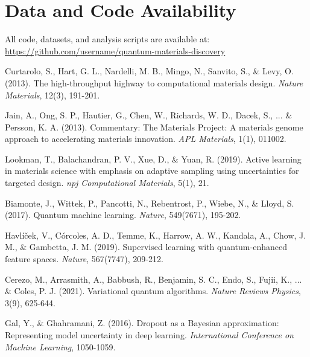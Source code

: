 \documentclass[twocolumn]{article}
\begin{document}
\section*{Data and Code Availability}

All code, datasets, and analysis scripts are available at: \url{https://github.com/username/quantum-materials-discovery}

\begin{thebibliography}{30}

Curtarolo, S., Hart, G. L., Nardelli, M. B., Mingo, N., Sanvito, S., \& Levy, O. (2013). The high-throughput highway to computational materials design. \textit{Nature Materials}, 12(3), 191-201.

Jain, A., Ong, S. P., Hautier, G., Chen, W., Richards, W. D., Dacek, S., ... \& Persson, K. A. (2013). Commentary: The Materials Project: A materials genome approach to accelerating materials innovation. \textit{APL Materials}, 1(1), 011002.

Lookman, T., Balachandran, P. V., Xue, D., \& Yuan, R. (2019). Active learning in materials science with emphasis on adaptive sampling using uncertainties for targeted design. \textit{npj Computational Materials}, 5(1), 21.

Biamonte, J., Wittek, P., Pancotti, N., Rebentrost, P., Wiebe, N., \& Lloyd, S. (2017). Quantum machine learning. \textit{Nature}, 549(7671), 195-202.

Havlíček, V., Córcoles, A. D., Temme, K., Harrow, A. W., Kandala, A., Chow, J. M., \& Gambetta, J. M. (2019). Supervised learning with quantum-enhanced feature spaces. \textit{Nature}, 567(7747), 209-212.

Cerezo, M., Arrasmith, A., Babbush, R., Benjamin, S. C., Endo, S., Fujii, K., ... \& Coles, P. J. (2021). Variational quantum algorithms. \textit{Nature Reviews Physics}, 3(9), 625-644.

Gal, Y., \& Ghahramani, Z. (2016). Dropout as a Bayesian approximation: Representing model uncertainty in deep learning. \textit{International Conference on Machine Learning}, 1050-1059.

\end{thebibliography}
\end{document}

